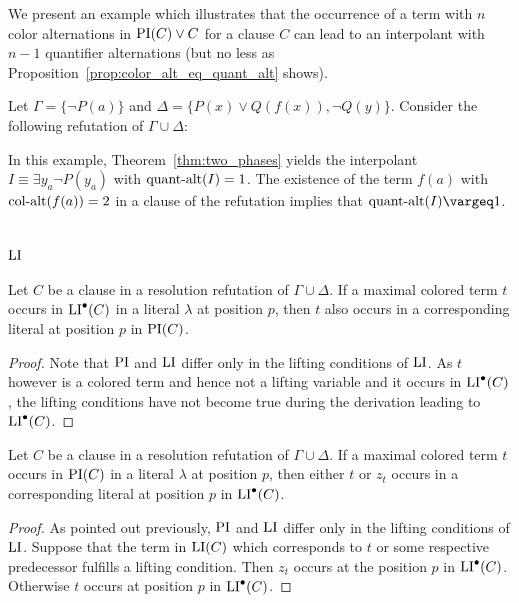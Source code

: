 \documentclass[%
	draft=false,%
	numbers=noendperiod,%
	11pt,%
	a4paper,%
	oneside,%
	openany,%
]{memoir}
\begin{document}
We present an example which illustrates that the occurrence of a term with $n$ color alternations in $\PI(C) \lor C$ for a clause $C$ can lead to an interpolant with $n-1$ quantifier alternations (but no less as Proposition~\ref{prop:color_alt_eq_quant_alt} shows).
\begin{exa}
	Let $\Gamma = \{ \lnot P(a) \}$ and $\Delta = \{ P(x) \lor Q(f(x)), \lnot Q(y) \}$.
	Consider the following refutation of $\Gamma \cup \Delta$:
	\begin{prooftree}


	\end{prooftree}

	In this example, Theorem~\ref{thm:two_phases} yields the interpolant $I \equiv \exists y_a \lnot P(y_a)$ with $\qa(I) =\nolinebreak 1$.
	The existence of the term $f(a)$ with $\ca(f(a)) = 2$ in a clause of the refutation implies that $\qa(I) \vargeq 1$.
\end{exa}



\section{$\LI$}


\begin{clemma}
	\label{lemma:pi_li_1}
	Let $C$ be a clause in a resolution refutation of $\Gamma \cup \Delta$.
	If a maximal colored term $t$ occurs in $\LIpre(C)$ in a literal $\lambda$ at position $p$, 
	then $t$ also occurs in a corresponding literal at position $p$ in $\PI(C)$.
\end{clemma}
\begin{proof}
	Note that $\PI$ and $\LI$ differ only in the lifting conditions of $\LI$.
	As $t$ however is a colored term and hence not a lifting variable and it occurs in $\LIpre(C)$, the lifting conditions have not become true during the derivation leading to $\LIpre(C)$.
\end{proof}

\begin{clemma}
	\label{lemma:pi_li_2}
	Let $C$ be a clause in a resolution refutation of $\Gamma \cup \Delta$.
	If a maximal colored term $t$ occurs in $\PI(C)$ in a literal $\lambda$ at position $p$, 
	then either $t$ or $z_t$ occurs in a corresponding literal at position $p$ in $\LIpre(C)$.
\end{clemma}
\begin{proof}
	As pointed out previously, $\PI$ and $\LI$ differ only in the lifting conditions of $\LI$.
	Suppose that the term in $\LI(C)$ which corresponds to $t$ or some respective predecessor fulfills a lifting condition.
	Then $z_t$ occurs at the position $p$ in $\LIpre(C)$.
	Otherwise $t$ occurs at position $p$ in $\LIpre(C)$.
\end{proof}
\end{document}
